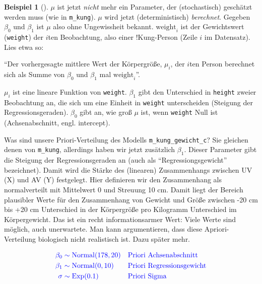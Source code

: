 \documentclass[
  ngerman,
  letterpaper,
  twoside,
  open=any]{scrbook}
\theoremstyle{definition}
\newtheorem{example}{Beispiel}[chapter]
\theoremstyle{plain}
\theoremstyle{definition}
\theoremstyle{definition}
\theoremstyle{remark}
\begin{document}
\begin{example}[]
\(\mu\) ist jetzt \emph{nicht} mehr ein Parameter, der (stochastisch)
geschätzt werden muss (wie in \texttt{m\_kung}). \(\mu\) wird jetzt
(deterministisch) \emph{berechnet}. Gegeben \(\beta_0\) und \(\beta_1\)
ist \(\mu\) also ohne Ungewissheit bekannt. \(\text{weight}_i\) ist der
Gewichtswert (\texttt{weight}) der \(i\)ten Beobachtung, also einer
!Kung-Person (Zeile \(i\) im Datensatz). Lies etwa so:

\begin{displayquote}
\enquote{Der vorhergesagte mittlere Wert der Körpergröße, \(\mu_i\), der
\(i\)ten Person berechnet sich als Summe von \(\beta_0\) und \(\beta_1\)
mal \(\text{weight}_i\)}.
\end{displayquote}

\(\mu_i\) ist eine lineare Funktion von \texttt{weight}. \(\beta_1\)
gibt den Unterschied in \texttt{height} zweier Beobachtung an, die sich
um eine Einheit in \texttt{weight} unterscheiden (Steigung der
Regressionsgeraden). \(\beta_0\) gibt an, wie groß \(\mu\) ist, wenn
\texttt{weight} Null ist (Achsenabschnitt, engl. intercept).

Was sind unsere Priori-Verteilung des Modells
\texttt{m\_kung\_gewicht\_c}? Sie gleichen denen von \texttt{m\_kung},
allerdings haben wir jetzt zusätzlich \(\beta_1\). Dieser Parameter gibt
die Steigung der Regressionsgeraden an (auch als
\enquote{Regressiongsgewicht} bezeichnet). Damit wird die Stärke des
(linearen) Zusammenhangs zwischen UV (X) und AV (Y) festgelegt. Hier
definieren wir den Zusammenhang als normalverteilt mit Mittelwert 0 und
Streuung 10 cm. Damit liegt der Bereich plausibler Werte für den
Zusammenhang von Gewicht und Größe zwischen -20 cm bis +20 cm
Unterschied in der Körpergröße pro Kilogramm Unterschied im
Körpergewicht. Das ist ein recht informationsarmer Wert: Viele Werte
sind möglich, auch unerwartete. Man kann argumentieren, dass diese
Apriori-Verteilung biologisch nicht realistisch ist. Dazu später mehr.

\begin{align*}
\color{blue}\beta_0 & \color{blue}\sim \color{blue}{\operatorname{Normal}(178, 20)} && \color{blue}{\text{Priori Achsenabschnitt}} \\
\color{blue}\beta_1  & \color{blue}\sim \color{blue}{\operatorname{Normal}(0, 10)}  && \color{blue}{\text{Priori Regressionsgewicht}}\\
\color{blue}\sigma & \color{blue}\sim \color{blue}{\operatorname{Exp}(0.1)}  && \color{blue}{\text{Priori Sigma}}
\end{align*}


\end{example}
\end{document}
